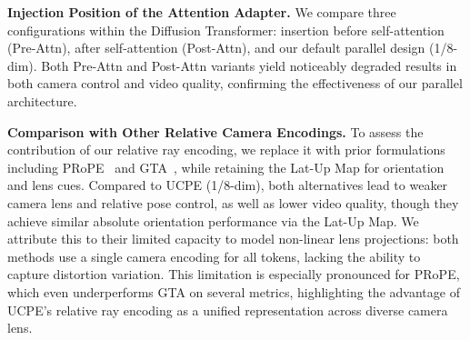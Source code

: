 \noindent\textbf{Injection Position of the Attention Adapter.}
We compare three configurations within the Diffusion Transformer: insertion before self-attention (Pre-Attn), after self-attention (Post-Attn), and our default parallel design (1/8-dim).
Both Pre-Attn and Post-Attn variants yield noticeably degraded results in both camera control and video quality, confirming the effectiveness of our parallel architecture.

\noindent\textbf{Comparison with Other Relative Camera Encodings.}
To assess the contribution of our relative ray encoding, we replace it with prior formulations including PRoPE~\cite{li2025cameras} and GTA~\cite{miyato2023gta}, while retaining the Lat-Up Map for orientation and lens cues.
Compared to UCPE (1/8-dim), both alternatives lead to weaker camera lens and relative pose control, as well as lower video quality, though they achieve similar absolute orientation performance via the Lat-Up Map.
We attribute this to their limited capacity to model non-linear lens projections: both methods use a single camera encoding for all tokens, lacking the ability to capture distortion variation.
This limitation is especially pronounced for PRoPE, which even underperforms GTA on several metrics, highlighting the advantage of UCPE's relative ray encoding as a unified representation across diverse camera lens.
